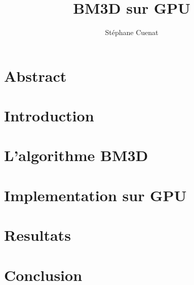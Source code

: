 \documentclass{article}
\begin{document}
\title{BM3D sur GPU}
\author{Stéphane Cuenat}
\maketitle

\section{Abstract}



\section{Introduction}


\section{L'algorithme BM3D}


\section{Implementation sur GPU}


\section{Resultats}


\section{Conclusion}
\end{document}
